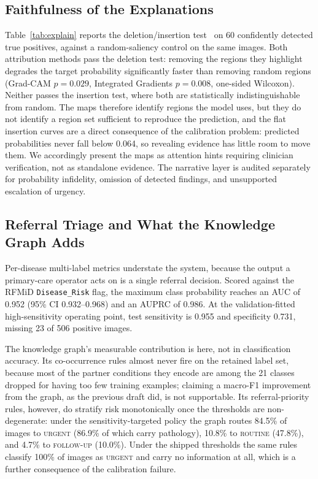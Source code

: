 \documentclass[11pt]{IEEEtran}
\begin{document}
\subsection{Faithfulness of the Explanations}
Table~\ref{tab:explain} reports the deletion/insertion test~\cite{rise2018} on 60 confidently
detected true positives, against a random-saliency control on the same images. Both attribution
methods pass the deletion test: removing the regions they highlight degrades the target
probability significantly faster than removing random regions (Grad-CAM $p{=}0.029$, Integrated
Gradients $p{=}0.008$, one-sided Wilcoxon). Neither passes the insertion test, where both are
statistically indistinguishable from random. The maps therefore identify regions the model uses,
but they do not identify a region set sufficient to reproduce the prediction, and the flat
insertion curves are a direct consequence of the calibration problem: predicted probabilities
never fall below 0.064, so revealing evidence has little room to move them. We accordingly
present the maps as attention hints requiring clinician verification, not as standalone evidence.
The narrative layer is audited separately for probability infidelity, omission of detected
findings, and unsupported escalation of urgency.



\subsection{Referral Triage and What the Knowledge Graph Adds}
Per-disease multi-label metrics understate the system, because the output a primary-care operator
acts on is a single referral decision. Scored against the RFMiD \texttt{Disease\_Risk} flag, the
maximum class probability reaches an AUC of 0.952 (95\% CI 0.932--0.968) and an AUPRC of 0.986. At
the validation-fitted high-sensitivity operating point, test sensitivity is 0.955 and specificity
0.731, missing 23 of 506 positive images.

The knowledge graph's measurable contribution is here, not in classification accuracy. Its
co-occurrence rules almost never fire on the retained label set, because most of the partner
conditions they encode are among the 21 classes dropped for having too few training examples;
claiming a macro-F1 improvement from the graph, as the previous draft did, is not supportable. Its
referral-priority rules, however, do stratify risk monotonically once the thresholds are
non-degenerate: under the sensitivity-targeted policy the graph routes 84.5\% of images to
\textsc{urgent} (86.9\% of which carry pathology), 10.8\% to \textsc{routine} (47.8\%), and 4.7\%
to \textsc{follow-up} (10.0\%). Under the shipped thresholds the same rules classify 100\% of
images as \textsc{urgent} and carry no information at all, which is a further consequence of the
calibration failure.
\end{document}
